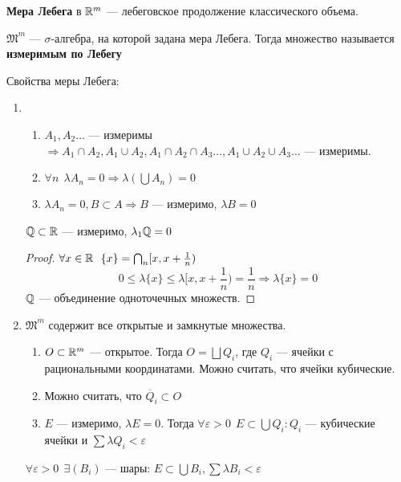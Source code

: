 \begin{definition}
    \textbf{Мера Лебега} в \(\mathbb{R}^m\) --- лебеговское продолжение классического объема.

    \(\mathfrak{M}^m\) --- \(\sigma\)-алгебра, на которой задана мера Лебега. Тогда множество называется \textbf{измеримым по Лебегу}

\end{definition}

Свойства меры Лебега:
\begin{enumerate}
    \item \begin{enumerate}
              \item \(A_1, A_2 \dots \) --- измеримы \( \Rightarrow A_1\cap A_2, A_1\cup A_2, A_1\cap A_2\cap A_3 \dots , A_1\cup A_2\cup A_3 \dots\) --- измеримы.
              \item \(\forall n \ \ \lambda A_n = 0 \Rightarrow \lambda(\bigcup A_n) = 0\)
              \item \(\lambda A_n = 0, B\subset A \Rightarrow B\) --- измеримо, \(\lambda B = 0\)
          \end{enumerate}

          \begin{example}
              \(\mathbb{Q} \subset \mathbb{R}\) --- измеримо, \(\lambda_1 \mathbb{Q} = 0\)
          \end{example}
          \begin{proof}
              \(\forall x\in \mathbb{R} \ \ \{x\} = \bigcap_n[x, x + \frac{1}{n})\)
              \[0 \leq \lambda \{x\} \leq \lambda[x, x + \frac{1}{n}) = \frac{1}{n} \Rightarrow \lambda \{x\} = 0\]
              \(\mathbb{Q}\) --- объединение одноточечных множеств.
          \end{proof}
    \item \(\mathfrak{M}^m\) содержит все открытые и замкнутые множества.
          \begin{lemma}\itemfix
              \begin{enumerate}
                  \item \(O\subset \mathbb{R}^m\) --- открытое. Тогда \(O = \bigsqcup Q_i\), где \(Q_i\) --- ячейки с рациональными координатами. Можно считать, что ячейки кубические.
                  \item Можно считать, что \(\overline Q_i \subset O\)
                  \item \(E\) --- измеримо, \(\lambda E = 0\). Тогда \(\forall \varepsilon > 0 \ \ E\subset \bigcup Q_i : Q_i\) --- кубические ячейки и \(\sum \lambda Q_i < \varepsilon\)
              \end{enumerate}
          \end{lemma}
          \begin{remark}
              \(\forall \varepsilon > 0\ \ \exists (B_i)\) --- шары: \(E\subset \bigcup B_i, \sum \lambda B_i < \varepsilon\)


\end{remark}
\end{enumerate}
